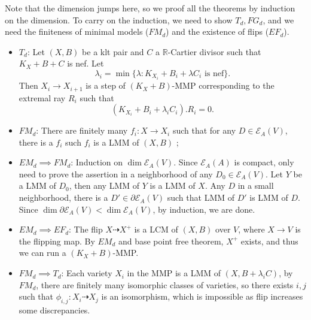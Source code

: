 \documentclass{article}
\begin{document}
Note that the dimension jumps here, so we proof all the theorems by induction on the dimension. To carry on the induction, we need to show $T_{d},FG_{d}$, and we need the finiteness of minimal models ($FM_{d}$) and the existence of flips ($EF_{d}$). 
\begin{itemize}
  \item $T_{d}$: Let $(X,B)$ be a klt pair and $C$ a $\mathbb{R}$-Cartier divisor such that $K_{X}+B+C$ is nef. Let
    \[
      \lambda_{i}=\min \{\lambda: K_{X_{i}}+B_{i}+\lambda C_{i} \text{ is nef}\} .
    \]
   Then $X_{i}\to X_{i+1}$ is a step of $(K_{X}+B)$-MMP corresponding to the extremal ray $R_{i}$ such that
   \[
     (K_{X_{i}}+B_{i}+\lambda_{i}C_{i}).R_{i}=0.
   \]
  \item $FM_{d}$: There are finitely many $f_{i}:X \to X_{i}$ such that for any $D \in \mathcal{E}_{A}(V)$, there is a $f_{i}$ such $f_{i}$ is a LMM of $(X,B)$ ;
  \item $EM_{d}\implies FM_{d}$: Induction on $\dim \mathcal{E}_{A}(V)$. Since $\mathcal{E}_{A}(A)$ is compact, only need to prove the assertion in a neighborhood of any $D_{0} \in \mathcal{E}_{A}(V)$. Let $Y$ be a LMM of $D_{0}$, then any LMM of $Y$ is a LMM of $X$. Any $D$ in a small neighborhood, there is a $D' \in \partial \mathcal{E}_{A}(V)$ such that LMM of $D'$ is LMM of $D$. Since $\dim \partial \mathcal{E}_{A}(V) < \dim \mathcal{E}_{A}(V)$, by induction, we are done.
  \item $EM_{d}\implies EF_{d}$: The flip $X \dashrightarrow X^{+}$ is a LCM of $(X,B)$ over $V$, where $X\to V$ is the flipping map. By $EM_{d}$ and base point free theorem, $X^{+}$ exists, and thus we can run a $(K_{X}+B)$-MMP.
  \item $FM_{d}\implies T_{d}$: Each variety $X_{i}$ in the MMP is a LMM of $(X,B+\lambda_{i}C)$, by $FM_{d}$, there are finitely many isomorphic classes of varieties, so there exists $i,j$ such that $\phi_{i,j}:X_{i} \dashrightarrow  X_{j}$ is an isomorphism, which is impossible as flip increases some discrepancies.
\end{itemize}
\end{document}
